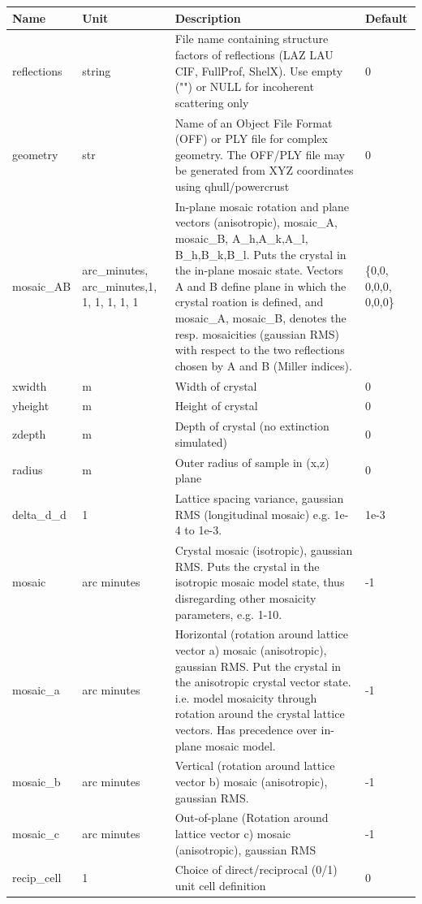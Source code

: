 \begin{longtable}{p{}p{}p{}p{}}
\toprule
\textbf{Name} & \textbf{Unit} & \textbf{Description} & \textbf{Default} \\
\midrule
\endhead
reflections & string & File name containing structure factors of reflections (LAZ LAU CIF, FullProf, ShelX). Use empty ("") or NULL for incoherent scattering only & 0 \\
geometry & str & Name of an Object File Format (OFF) or PLY file for complex geometry. The OFF/PLY file may be generated from XYZ coordinates using qhull/powercrust & 0 \\
mosaic\_AB & arc\_minutes, arc\_minutes,1, 1, 1, 1, 1, 1 & In-plane mosaic rotation and plane vectors (anisotropic), mosaic\_A, mosaic\_B, A\_h,A\_k,A\_l, B\_h,B\_k,B\_l. Puts the crystal in the in-plane mosaic state. Vectors A and B define plane in which the crystal roation is defined, and mosaic\_A, mosaic\_B, denotes the resp. mosaicities (gaussian RMS) with respect to the two reflections chosen by A and B (Miller indices). & \{0,0, 0,0,0, 0,0,0\} \\
xwidth & m & Width of crystal & 0 \\
yheight & m & Height of crystal & 0 \\
zdepth & m & Depth of crystal (no extinction simulated) & 0 \\
radius & m & Outer radius of sample in (x,z) plane & 0 \\
delta\_d\_d & 1 & Lattice spacing variance, gaussian RMS (longitudinal mosaic) e.g. 1e-4 to 1e-3. & 1e-3 \\
mosaic & arc minutes & Crystal mosaic (isotropic), gaussian RMS. Puts the crystal in the isotropic mosaic model state, thus disregarding other mosaicity parameters, e.g. 1-10. & -1 \\
mosaic\_a & arc minutes & Horizontal (rotation around lattice vector a) mosaic (anisotropic), gaussian RMS. Put the crystal in the anisotropic crystal vector state. i.e. model mosaicity through rotation around the crystal lattice vectors. Has precedence over in-plane mosaic model. & -1 \\
mosaic\_b & arc minutes & Vertical (rotation around lattice vector b) mosaic (anisotropic), gaussian RMS. & -1 \\
mosaic\_c & arc minutes & Out-of-plane (Rotation around lattice vector c) mosaic (anisotropic), gaussian RMS & -1 \\
recip\_cell & 1 & Choice of direct/reciprocal (0/1) unit cell definition & 0 \\

\end{longtable}
